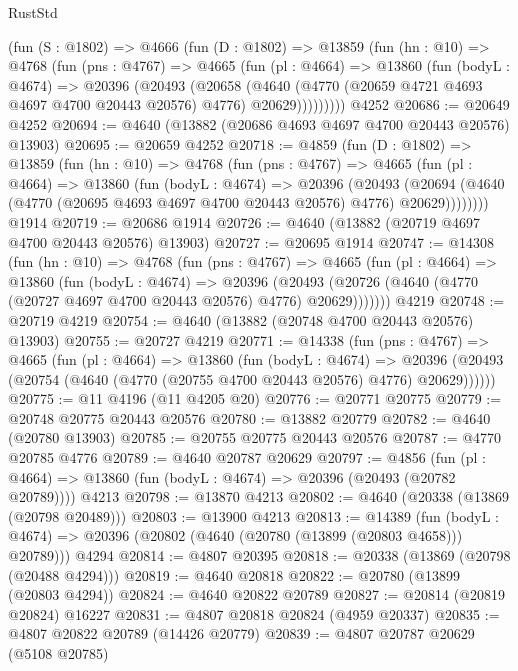\begin{lexlean}{RustStd}
\begin{coremodule}
    (fun (S : @1802) =>
    @4666
      (fun (D : @1802) =>
      @13859
        (fun (hn : @10) =>
        @4768
          (fun (pns : @4767) =>
          @4665
            (fun (pl : @4664) =>
            @13860
              (fun (bodyL : @4674) =>
              @20396
                (@20493
                  (@20658
                    (@4640
                      (@4770 (@20659 @4721 @4693 @4697 @4700 @20443 @20576) @4776)
                      @20629)))))))))
    @4252
@20686 := @20649 @4252
@20694 := @4640 (@13882 (@20686 @4693 @4697 @4700 @20443 @20576) @13903)
@20695 := @20659 @4252
@20718 := @4859
    (fun (D : @1802) =>
    @13859
      (fun (hn : @10) =>
      @4768
        (fun (pns : @4767) =>
        @4665
          (fun (pl : @4664) =>
          @13860
            (fun (bodyL : @4674) =>
            @20396
              (@20493
                (@20694 (@4640 (@4770 (@20695 @4693 @4697 @4700 @20443 @20576) @4776) @20629))))))))
    @1914
@20719 := @20686 @1914
@20726 := @4640 (@13882 (@20719 @4697 @4700 @20443 @20576) @13903)
@20727 := @20695 @1914
@20747 := @14308
    (fun (hn : @10) =>
    @4768
      (fun (pns : @4767) =>
      @4665
        (fun (pl : @4664) =>
        @13860
          (fun (bodyL : @4674) =>
          @20396
            (@20493 (@20726 (@4640 (@4770 (@20727 @4697 @4700 @20443 @20576) @4776) @20629)))))))
    @4219
@20748 := @20719 @4219
@20754 := @4640 (@13882 (@20748 @4700 @20443 @20576) @13903)
@20755 := @20727 @4219
@20771 := @14338
    (fun (pns : @4767) =>
    @4665
      (fun (pl : @4664) =>
      @13860
        (fun (bodyL : @4674) =>
        @20396 (@20493 (@20754 (@4640 (@4770 (@20755 @4700 @20443 @20576) @4776) @20629))))))
@20775 := @11 @4196 (@11 @4205 @20)
@20776 := @20771 @20775
@20779 := @20748 @20775 @20443 @20576
@20780 := @13882 @20779
@20782 := @4640 (@20780 @13903)
@20785 := @20755 @20775 @20443 @20576
@20787 := @4770 @20785 @4776
@20789 := @4640 @20787 @20629
@20797 := @4856
    (fun (pl : @4664) => @13860 (fun (bodyL : @4674) => @20396 (@20493 (@20782 @20789))))
    @4213
@20798 := @13870 @4213
@20802 := @4640 (@20338 (@13869 (@20798 @20489)))
@20803 := @13900 @4213
@20813 := @14389
    (fun (bodyL : @4674) => @20396 (@20802 (@4640 (@20780 (@13899 (@20803 @4658))) @20789)))
    @4294
@20814 := @4807 @20395
@20818 := @20338 (@13869 (@20798 (@20488 @4294)))
@20819 := @4640 @20818
@20822 := @20780 (@13899 (@20803 @4294))
@20824 := @4640 @20822 @20789
@20827 := @20814 (@20819 @20824) @16227
@20831 := @4807 @20818 @20824 (@4959 @20337)
@20835 := @4807 @20822 @20789 (@14426 @20779)
@20839 := @4807 @20787 @20629 (@5108 @20785)

\end{coremodule}
\end{lexlean}
